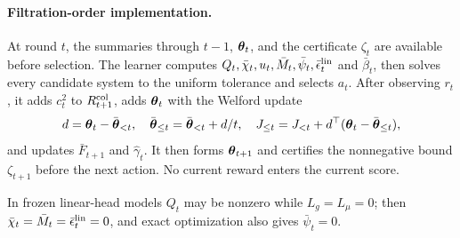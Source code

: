 \paragraph{Filtration-order implementation.}
At round $t$, the summaries through $t-1$, $\boldsymbol{\theta}_t$, and the certificate
$\zeta_t$ are available before selection.  The learner computes
$Q_t,\bar\chi_t,u_t,\bar M_t,\bar\psi_t,\bar\epsilon_t^{\rm lin}$ and
$\bar\beta_t$, then solves every candidate system to the uniform tolerance
and selects $a_t$.  After observing $r_t$, it adds $c_t^2$ to
$R_{t+1}^{\rm col}$, adds $\boldsymbol{\theta}_t$ with the Welford update
\[
 d=\boldsymbol{\theta}_t-\bar{\boldsymbol{\theta}}_{<t},\quad
 \bar{\boldsymbol{\theta}}_{\le t}=\bar{\boldsymbol{\theta}}_{<t}+d/t,\quad
 J_{\le t}=J_{<t}+d^\top(\boldsymbol{\theta}_t-\bar{\boldsymbol{\theta}}_{\le t}),
\]
and updates $\bar F_{t+1}$ and $\hat\gamma_t$.  It then forms
$\boldsymbol{\theta}_{t+1}$ and certifies the nonnegative bound $\zeta_{t+1}$ before
the next action.  No current reward enters the current score.

In frozen linear-head models $Q_t$ may be nonzero while $L_g=L_\mu=0$;
then $\bar\chi_t=\bar M_t=\bar\epsilon_t^{\rm lin}=0$, and exact
optimization also gives $\bar\psi_t=0$.

